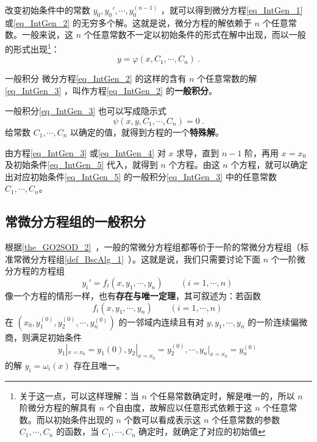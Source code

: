 改变初始条件中的常数 $y_0,y_0',\cdots,y_0^{(n-1)}$ ，就可以得到微分方程\autoref{eq_IntGen_1} 或\autoref{eq_IntGen_2} 的无穷多个解。这就是说，微分方程的解依赖于 $n$ 个任意常数。一般来说，这 $n$ 个任意常数不一定以初始条件的形式在解中出现，而以一般的形式出现\footnote{关于这一点，可以这样理解：当 $n$ 个任易常数确定时，解是唯一的，所以 $n$ 阶微分方程的解具有 $n$ 个自由度，故解应以任意形式依赖于这 $n$ 个任意常数。而以初始条件出现的 $n$ 个数可以看成表示这 $n$ 个任意常数的参数 $C_1,\cdots,C_n$ 的函数，当 $C_1,\cdots,C_n$ 确定时，就确定了对应的初始值}：
\begin{equation}\label{eq_IntGen_3}
y=\varphi(x,C_1,\cdots,C_n)~.
\end{equation}
\begin{definition}{一般积分}
微分方程\autoref{eq_IntGen_2} 的这样的含有 $n$ 个任意常数的解\autoref{eq_IntGen_3} ，叫作方程\autoref{eq_IntGen_2} 的\textbf{一般积分}。
\end{definition}
一般积分\autoref{eq_IntGen_3} 也可以写成隐示式
\begin{equation}\label{eq_IntGen_4}
\psi(x,y,C_1,\cdots,C_n)=0~.
\end{equation}
给常数 $C_1,\cdots,C_n$ 以确定的值，就得到方程的一个\textbf{特殊解}。

由方程\autoref{eq_IntGen_3} 或\autoref{eq_IntGen_4} 对 $x$ 求导，直到 $n-1$ 阶，再用 $x=x_0$ 及初始条件\autoref{eq_IntGen_5} 代入，就得到 $n$ 个方程。由这 $n$ 个方程，就可以确定出对应初始条件\autoref{eq_IntGen_5} 的一般积分\autoref{eq_IntGen_3} 中的任意常数 $C_1,\cdots,C_n$。
\subsection{常微分方程组的一般积分}
根据\autoref{the_GO2SOD_2}~，一般的常微分方程组都等价于一阶的常微分方程组（标准常微分方程组\autoref{def_BscAlg_1}~）。这就是说，我们只需要讨论下面 $n$ 个一阶微分方程的方程组
\begin{equation}\label{eq_IntGen_6}
y_i'=f_i(x,y_1,\cdots,y_n)\qquad (i=1,\cdots,n)~
\end{equation}
像一个方程的情形一样，也有\textbf{存在与唯一定理}，其可叙述为：若函数
\begin{equation}
f_i(x,y_1,\cdots,y_n)\qquad (i=1,\cdots,n)~
\end{equation}
在 $(x_0,y_1^{(0)},y_2^{(0)},\cdots,y_n^{(0)})$ 的一邻域内连续且有对 $y,y_1,\cdots,y_n$ 的一阶连续偏微商，则满足初始条件
\begin{equation}\label{eq_IntGen_8}
y_1|_{x=x_0}=y_1{(0)},y_2|_{x=x_0}=y_2^{(0)},\cdots,y_n|_{x=x_0}=y_n^{(0)}~
\end{equation}
的解 $y_i=\omega_i(x)$ 存在且唯一。

